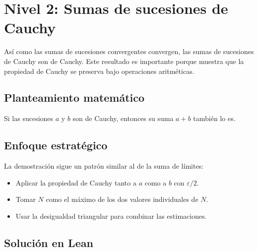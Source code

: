 \section{Nivel 2: Sumas de sucesiones de Cauchy}

Así como las sumas de sucesiones convergentes convergen, las sumas de sucesiones de Cauchy son de Cauchy. Este resultado es importante porque muestra que la propiedad de Cauchy se preserva bajo operaciones aritméticas.

\subsection{Planteamiento matemático}

\begin{teorema}
Si las sucesiones $a$ y $b$ son de Cauchy, entonces su suma $a + b$ también lo es.
\end{teorema}

\subsection{Enfoque estratégico}

La demostración sigue un patrón similar al de la suma de límites:
\begin{itemize}
  \item Aplicar la propiedad de Cauchy tanto a $a$ como a $b$ con $\varepsilon/2$.
  \item Tomar $N$ como el máximo de los dos valores individuales de $N$.
  \item Usar la desigualdad triangular para combinar las estimaciones.
\end{itemize}

\subsection{Solución en Lean}

